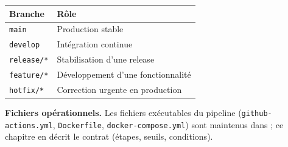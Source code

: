 \begin{center}
\begin{tabular}{ll}
\toprule
\textbf{Branche} & \textbf{Rôle} \\
\midrule
\texttt{main}       & Production stable \\
\texttt{develop}    & Intégration continue \\
\texttt{release/*}  & Stabilisation d'une release \\
\texttt{feature/*}  & Développement d'une fonctionnalité \\
\texttt{hotfix/*}   & Correction urgente en production \\
\bottomrule
\end{tabular}
\end{center}

\begin{encadre}
\textbf{Fichiers opérationnels.} Les fichiers exécutables du pipeline
(\texttt{github-actions.yml}, \texttt{Dockerfile},
\texttt{docker-compose.yml}) sont maintenus dans
 ;
ce chapitre en
décrit le contrat (étapes, seuils, conditions).
\end{encadre}
